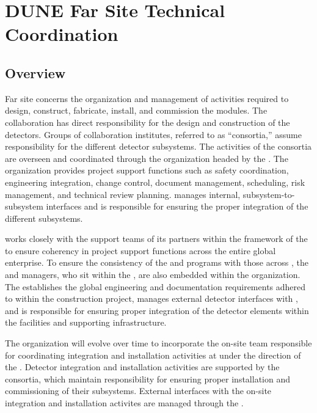 \chapter{DUNE Far Site Technical Coordination}
\label{ch:exec-tc}

\section{Overview}

Far site  concerns the organization and management of 
activities required to design, construct,
fabricate, install, and commission the   modules. 
      The  collaboration has direct responsibility for the design 
and construction of the  detectors.  Groups of collaboration 
institutes, referred to as ``consortia,'' assume responsibility for 
the different detector subsystems.  The activities of the consortia are 
overseen and coordinated through the   organization 
headed by the  .  The  organization 
provides project support functions such as safety coordination, 
engineering integration, change control, document management, scheduling, 
risk management, and technical review planning.    
manages internal, subsystem-to-subsystem interfaces and is responsible 
for ensuring the proper integration of the different subsystems.   

  works closely with the support teams of its 
 partners within the framework of the  to 
ensure coherency in project support functions across the entire global 
enterprise.  To ensure the consistency of the   
and  programs with those across , the 
  and  managers, who sit within 
the , are also embedded within the   
organization.  The  establishes the global engineering
and documentation requirements adhered to within the  
 construction project, manages external  detector 
interfaces with , and is responsible for ensuring proper 
integration of the  detector elements within the facilities 
and supporting infrastructure.  

The  organization will evolve over time to incorporate the 
on-site team responsible for coordinating integration and installation 
activities at  under the direction of the .  
Detector integration and installation activities are supported by the 
 consortia, which maintain responsibility for ensuring 
proper installation and commissioning of their subsystems.  External 
 interfaces with the on-site integration and installation 
activites are managed through the .

